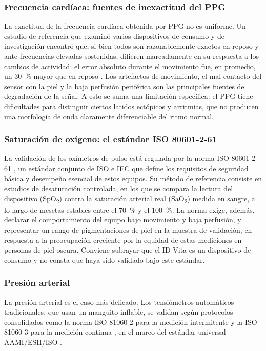 \documentclass[12pt,a4paper]{article}
\begin{document}
    \subsubsection{Frecuencia cardíaca: fuentes de inexactitud del PPG}
    La exactitud de la frecuencia cardíaca obtenida por PPG no es uniforme. Un estudio de referencia que examinó varios dispositivos de consumo y de investigación encontró que, si bien todos son razonablemente exactos en reposo y ante frecuencias elevadas sostenidas, difieren marcadamente en su respuesta a los cambios de actividad: el error absoluto durante el movimiento fue, en promedio, un 30~\% mayor que en reposo \cite{bent2020}. Los artefactos de movimiento, el mal contacto del sensor con la piel y la baja perfusión periférica son las principales fuentes de degradación de la señal. A esto se suma una limitación específica: el PPG tiene dificultades para distinguir ciertos latidos ectópicos y arritmias, que no producen una morfología de onda claramente diferenciable del ritmo normal.

    \subsubsection{Saturación de oxígeno: el estándar ISO 80601-2-61}
    La validación de los oxímetros de pulso está regulada por la norma ISO 80601-2-61 \cite{iso80601}, un estándar conjunto de ISO e IEC que define los requisitos de seguridad básica y desempeño esencial de estos equipos. Su método de referencia consiste en estudios de desaturación controlada, en los que se compara la lectura del dispositivo (SpO\textsubscript{2}) contra la saturación arterial real (SaO\textsubscript{2}) medida en sangre, a lo largo de mesetas estables entre el 70~\% y el 100~\%. La norma exige, además, declarar el comportamiento del equipo bajo movimiento y baja perfusión, y representar un rango de pigmentaciones de piel en la muestra de validación, en respuesta a la preocupación creciente por la equidad de estas mediciones en personas de piel oscura. Conviene subrayar que el ID Vita es un dispositivo de consumo y no consta que haya sido validado bajo este estándar.

    \subsubsection{Presión arterial}
    La presión arterial es el caso más delicado. Los tensiómetros automáticos tradicionales, que usan un manguito inflable, se validan según protocolos consolidados como la norma ISO 81060-2 para la medición intermitente \cite{iso81060_2} y la ISO 81060-3 para la medición continua \cite{iso81060_3}, en el marco del estándar universal AAMI/ESH/ISO \cite{stergiou2018}.
\end{document}
